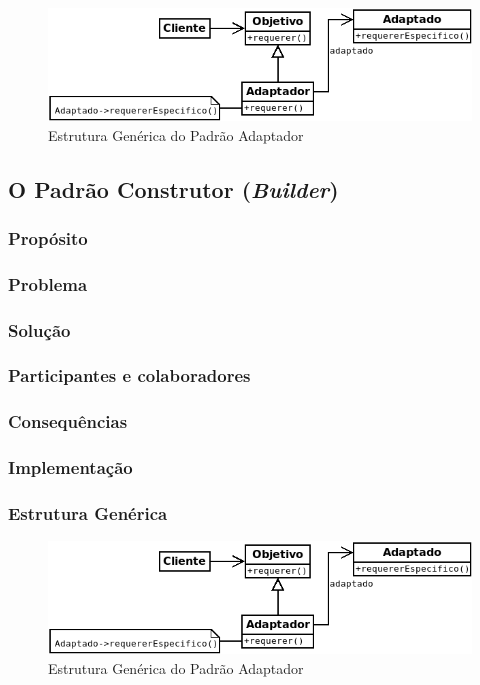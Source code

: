 \begin{figure}[h]
\begin{center}
\includegraphics[scale=0.6]{adaptador.png}
\caption{Estrutura Genérica do Padrão Adaptador}\label{fig:adaptador}
\end{center}
\end{figure}

\subsection{O Padrão Construtor (\textit{Builder})}
\subsubsection{Propósito}
\subsubsection{Problema}
\subsubsection{Solução}
\subsubsection{Participantes e colaboradores}
\subsubsection{Consequências}
\subsubsection{Implementação}
\subsubsection{Estrutura Genérica}

\begin{figure}[h]
\begin{center}
\includegraphics[scale=0.6]{adaptador.png}
\caption{Estrutura Genérica do Padrão Adaptador}\label{fig:adaptador}
\end{center}
\end{figure}

